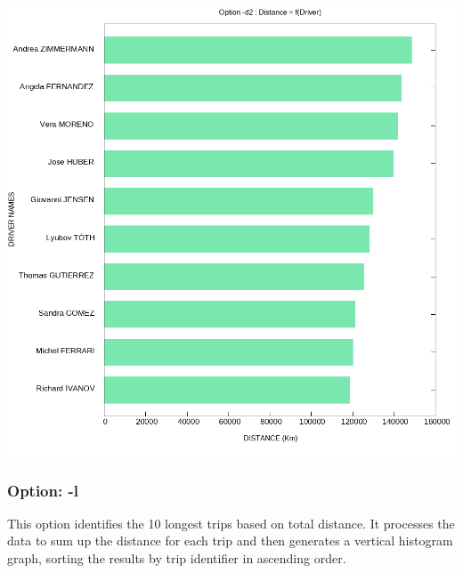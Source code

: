 \documentclass[11pt]{article}
\begin{document}
\vspace*{\fill}
\begin{center}
    \includegraphics[width=\textwidth]{d2_graph.png}
\end{center}
\vspace*{\fill}

\newpage
\subsubsection*{Option: \color{blue}-l}
This option identifies the 10 longest trips based on total distance. It processes the data to sum up the distance for each trip and then generates a vertical histogram graph, sorting the results by trip identifier in ascending order.
\end{document}
